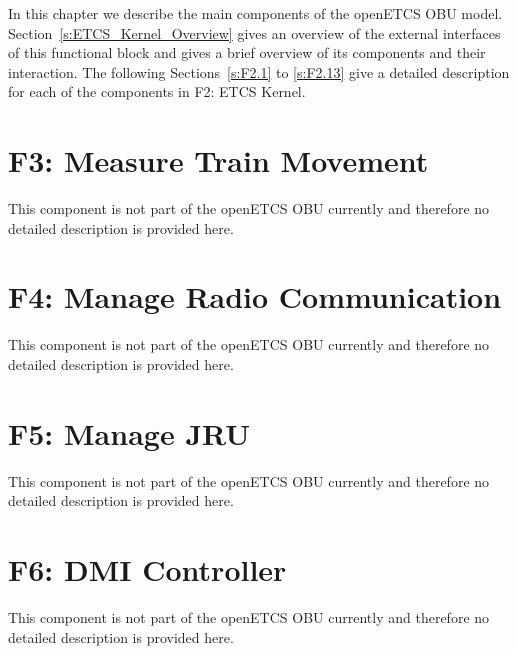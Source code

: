 \documentclass[oneside]{template/openetcs_report}
\begin{document}
In this chapter we describe the main components of the openETCS OBU model. Section~\ref{s:ETCS_Kernel_Overview} gives an overview of the external interfaces of this functional block and gives a brief overview of its components and their interaction. The following Sections~\ref{s:F2.1} to \ref{s:F2.13} give a detailed description for each of the components in F2: ETCS Kernel.






























\chapter{F3: Measure Train Movement}
This component is not part of the openETCS OBU currently and therefore no detailed description is provided here.

\chapter{F4: Manage Radio Communication}
This component is not part of the openETCS OBU currently and therefore no detailed description is provided here.

\chapter{F5: Manage JRU}
This component is not part of the openETCS OBU currently and therefore no detailed description is provided here.

\chapter{F6: DMI Controller}
This component is not part of the openETCS OBU currently and therefore no detailed description is provided here.
%
\end{document}
